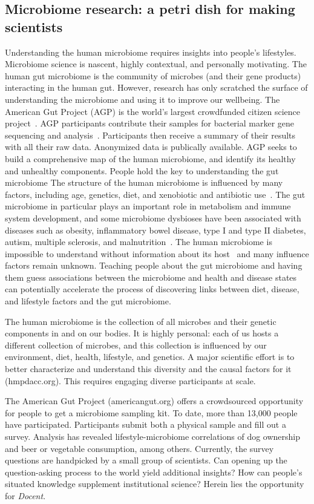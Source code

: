 \subsection{Microbiome research: a petri dish for making scientists}
Understanding the human microbiome requires insights
into people’s lifestyles. Microbiome science is nascent, highly contextual, and personally motivating.
The human gut microbiome is the community of microbes
(and their gene products) interacting in the human gut.
However, research has only scratched the surface of understanding the microbiome and using it to improve our wellbeing. The American Gut Project (AGP) is the world's
largest crowdfunded citizen science project~\cite{KnightLab2016a}. AGP
participants contribute their samples for bacterial marker
gene sequencing and analysis~\cite{Debelius2016}. Participants then receive
a summary of their results with all their raw data. Anonymized data is publically available. AGP seeks to build a
comprehensive map of the human microbiome, and identify
its healthy and unhealthy components.
People hold the key to understanding the gut microbiome
The structure of the human microbiome is influenced by
many factors, including age, genetics, diet, and xenobiotic
and antibiotic use~\cite{Gill2006}. The gut microbiome in particular
plays an important role in metabolism and immune system
development, and some microbiome dysbioses have been
associated with diseases such as obesity, inflammatory
bowel disease, type I and type II diabetes, autism, multiple
sclerosis, and malnutrition~\cite{Cho2012}. The human microbiome is
impossible to understand without information about its host~\cite{Debelius2016} and many influence factors remain unknown. Teaching
people about the gut microbiome and having them guess
associations between the microbiome and health and disease states can potentially accelerate the process of discovering links between diet, disease, and lifestyle factors and
the gut microbiome.

The human microbiome is the collection of all microbes and
their genetic components in and on our bodies. It is highly
personal: each of us hosts a different collection of microbes,
and this collection is influenced by our environment, diet,
health, lifestyle, and genetics. A major scientific effort is to
better characterize and understand this diversity and the
causal factors for it (hmpdacc.org). This requires engaging
diverse participants at scale.

The American Gut Project (americangut.org) offers a
crowdsourced opportunity for people to get a microbiome
sampling kit. To date, more than 13,000 people have participated.
Participants submit both a physical sample and fill out
a survey. Analysis has revealed lifestyle-microbiome correlations
of dog ownership and beer or vegetable consumption,
among others. Currently, the survey questions are handpicked
by a small group of scientists. Can opening up the
question-asking process to the world yield additional insights?
How can people’s situated knowledge supplement institutional
science? Herein lies the opportunity for \textit{Docent}.


